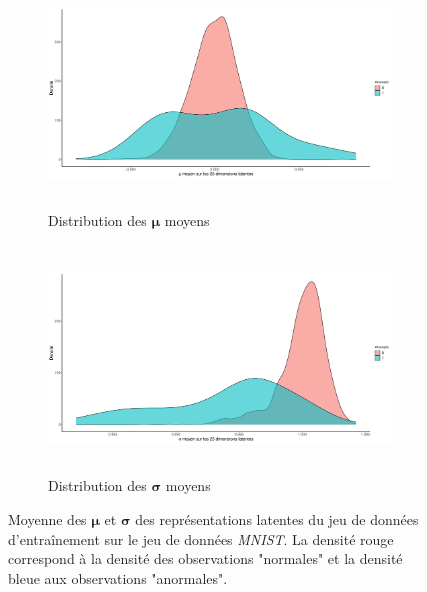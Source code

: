\begin{figure}[H]
	\centering
	\begin{subfigure}{12cm}
		\centering\includegraphics[width=12cm, height=6cm]{images/latent_stats/plot_mu_mnist}
		\caption{Distribution des $\boldsymbol{\mu}$ moyens}
	\end{subfigure}
	\begin{subfigure}{12cm}
		\centering\includegraphics[width=12cm, height=6cm]{images/latent_stats/plot_sigma_mnist}
		\caption{Distribution des $\boldsymbol{\sigma}$ moyens}
	\end{subfigure}
	\DIFdelbeginFL %
\DIFdelendFL \DIFaddbeginFL \caption[Moyenne des $\boldsymbol{\mu}$ et $\boldsymbol{\sigma}$ des représentations latentes du jeu de données d'entraînement sur le jeu de données \textit{MNIST}.]{\DIFaddendFL Moyenne des $\boldsymbol{\mu}$ et $\boldsymbol{\sigma}$ des représentations latentes du jeu de données d'entraînement sur le jeu de données \textit{MNIST}. La densité rouge correspond à la densité des observations "normales" et la densité bleue aux observations "anormales".}
	\label{fig:mnist_latent_stats}
\end{figure}

